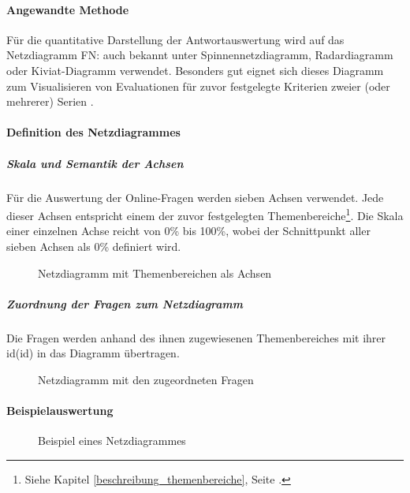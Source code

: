 \documentclass[../../main.tex]{subfiles}
\begin{document}
\paragraph*{Angewandte Methode}\mbox{}

\begin{sloppypar}
Für die quantitative Darstellung der Antwortauswertung wird auf das Netzdiagramm FN: auch bekannt unter Spinnennetzdiagramm, Radardiagramm oder Kiviat-Diagramm verwendet. Besonders gut eignet sich dieses Diagramm zum Visualisieren von Evaluationen für zuvor festgelegte Kriterien zweier (oder mehrerer) Serien \cite{wikipedia_netzdiagramm_2014}.
\end{sloppypar}

\paragraph*{Definition des Netzdiagrammes}

\subparagraph*{Skala und Semantik der Achsen}\mbox{}

\begin{sloppypar}
Für die Auswertung der Online-Fragen werden sieben Achsen verwendet. Jede dieser Achsen entspricht einem der zuvor   festgelegten Themenbereiche\footnote{Siehe Kapitel \ref{beschreibung_themenbereiche}, Seite \pageref{beschreibung_themenbereiche}. }. Die Skala einer einzelnen Achse reicht von 0\% bis 100\%, wobei der Schnittpunkt aller sieben Achsen als 0\% definiert wird.
\end{sloppypar}

\begin{figure}[H]
 \centering
    
 \caption{Netzdiagramm mit Themenbereichen als Achsen}
 \label{Netzdiagramm Schema}
\end{figure}

\subparagraph*{Zuordnung der Fragen zum Netzdiagramm}\mbox{}

\begin{sloppypar}
Die Fragen werden anhand des ihnen zugewiesenen Themenbereiches mit ihrer \acrshort{id}(\acrlong{id}) in das Diagramm übertragen.
\end{sloppypar}

\begin{figure}[H]
 \centering
    
 \caption{Netzdiagramm mit den zugeordneten Fragen}
 \label{Netzdiagramm Schema fragepositionen}
\end{figure}

\paragraph*{Beispielauswertung}\mbox{}

\begin{sloppypar}
\blindtext
\end{sloppypar}

\begin{figure}[H]
 \centering
    
 \caption{Beispiel eines Netzdiagrammes}
 \label{Netzdiagramm Schema beispiel}
\end{figure}
\end{document}
